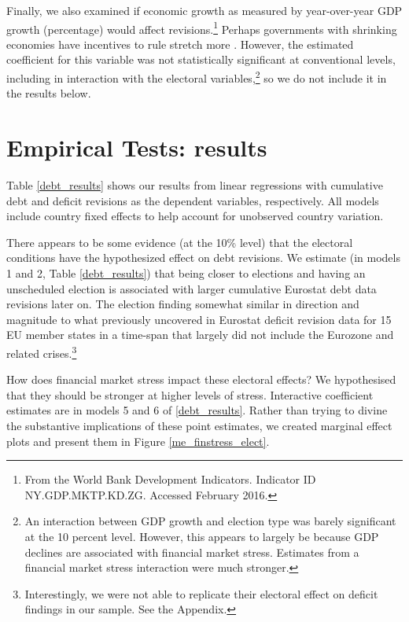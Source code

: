 \documentclass[]{article}
\begin{document}
Finally, we also examined if economic growth as measured by year-over-year GDP growth (percentage) would affect revisions.\footnote{From the World Bank Development Indicators. Indicator ID NY.GDP.MKTP.KD.ZG. Accessed February 2016.} Perhaps governments with shrinking economies have incentives to rule stretch more \citep{DeCastro2013}. However, the estimated coefficient for this variable was not statistically significant at conventional levels, including in interaction with the electoral variables,\footnote{An interaction between GDP growth and election type was barely significant at the 10 percent level. However, this appears to largely be because GDP declines are associated with financial market stress. Estimates from a financial market stress interaction were much stronger.} so we do not include it in the results below.

\section{Empirical Tests: results}

Table \ref{debt_results} shows our results from linear regressions with cumulative debt and deficit revisions as the dependent variables, respectively. All models include country fixed effects to help account for unobserved country variation.

There appears to be some evidence (at the 10\% level) that the electoral conditions have the hypothesized effect on debt revisions. We estimate (in models 1 and 2, Table \ref{debt_results}) that being closer to elections and having an unscheduled election is associated with larger cumulative Eurostat debt data revisions later on. The election finding somewhat similar in direction and magnitude to what \cite{DeCastro2013} previously uncovered in Eurostat deficit revision data for 15 EU member states in a time-span that largely did not include the Eurozone and related crises.\footnote{Interestingly, we were not able to replicate their electoral effect on deficit findings in our sample. See the Appendix.}

How does financial market stress impact these electoral effects? We hypothesised that they should be stronger at higher levels of stress. Interactive coefficient estimates are in models 5 and 6 of \ref{debt_results}. Rather than trying to divine the substantive implications of these point estimates, we created marginal effect plots and present them in Figure \ref{me_finstress_elect}.
\end{document}
